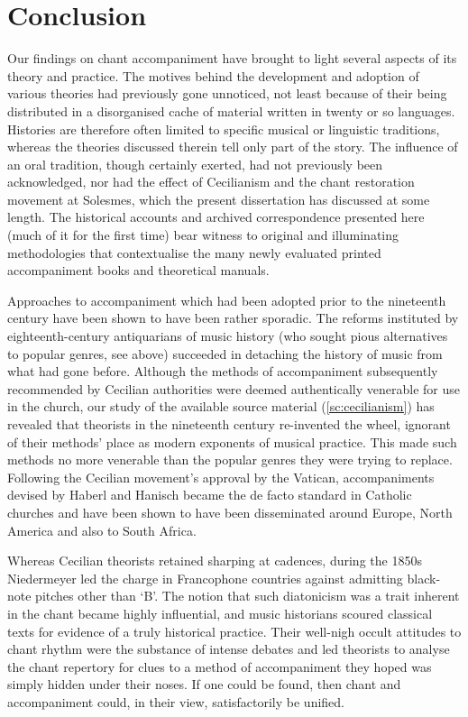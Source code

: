 \chapter*{Conclusion}
Our findings on chant accompaniment have brought to light several aspects of its theory and practice.
The motives behind the development and adoption of various theories had previously gone unnoticed, not least because of their being distributed in a disorganised cache of material written in twenty or so languages.
Histories are therefore often limited to specific musical or linguistic traditions, whereas the theories discussed therein tell only part of the story.
The influence of an oral tradition, though certainly exerted, had not previously been acknowledged, nor had the effect of Cecilianism and the chant restoration movement at Solesmes, which the present dissertation has discussed at some length.
The historical accounts and archived correspondence presented here (much of it for the first time) bear witness to original and illuminating methodologies that contextualise the many newly evaluated printed accompaniment books and theoretical manuals.

Approaches to accompaniment which had been adopted prior to the nineteenth century have been shown to have been rather sporadic.
The reforms instituted by eighteenth-century antiquarians of music history (who sought pious alternatives to popular genres, see  above) succeeded in detaching the history of music from what had gone before.
Although the methods of accompaniment subsequently recommended by Cecilian authorities were deemed authentically venerable for use in the church, our study of the available source material (\cref{sc:cecilianism}) has revealed that theorists in the nineteenth century re-invented the wheel, ignorant of their methods' place as modern exponents of musical practice.
This made such methods no more venerable than the popular genres they were trying to replace.
Following the Cecilian movement's approval by the Vatican, accompaniments devised by Haberl and Hanisch became the de facto standard in Catholic churches and have been shown to have been disseminated around Europe, North America and also to South Africa.
\nowidow[2]

Whereas Cecilian theorists retained sharping at cadences, during the 1850s Niedermeyer led the charge in Francophone countries against admitting black-note pitches other than `B'\kern 1pt\flat{}.
The notion that such diatonicism was a trait inherent in the chant became highly influential, and music historians scoured classical texts for evidence of a truly historical practice.
Their well-nigh occult attitudes to chant rhythm were the substance of intense debates and led theorists to analyse the chant repertory for clues to a method of accompaniment they hoped was simply hidden under their noses.
If one could be found, then chant and accompaniment could, in their view, satisfactorily be unified.

